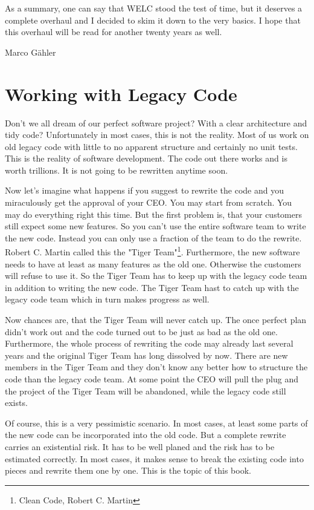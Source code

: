 As a summary, one can say that WELC stood the test of time, but it deserves a complete overhaul and I decided to skim it down to the very basics. I hope that this overhaul will be read for another twenty years as well.

Marco Gähler

\chapter{Working with Legacy Code}

Don't we all dream of our perfect software project? With a clear architecture and tidy code? Unfortunately in most cases, this is not the reality. Most of us work on old legacy code with little to no apparent structure and certainly no unit tests. This is the reality of software development. The code out there works and is worth trillions. It is not going to be rewritten anytime soon.

Now let's imagine what happens if you suggest to rewrite the code and you miraculously get the approval of your CEO. You may start from scratch. You may do everything right this time. But the first problem is, that your customers still expect some new features. So you can't use the entire software team to write the new code. Instead you can only use a fraction of the team to do the rewrite. Robert C. Martin called this the "Tiger Team"\footnote{Clean Code, Robert C. Martin}. Furthermore, the new software needs to have at least as many features as the old one. Otherwise the customers will refuse to use it. So the Tiger Team has to keep up with the legacy code team in addition to writing the new code. The Tiger Team hast to catch up with the legacy code team which in turn makes progress as well.

Now chances are, that the Tiger Team will never catch up. The once perfect plan didn't work out and the code turned out to be just as bad as the old one. Furthermore, the whole process of rewriting the code may already last several years and the original Tiger Team has long dissolved by now. There are new members in the Tiger Team and they don't know any better how to structure the code than the legacy code team. At some point the CEO will pull the plug and the project of the Tiger Team will be abandoned, while the legacy code still exists.

Of course, this is a very pessimistic scenario. In most cases, at least some parts of the new code can be incorporated into the old code. But a complete rewrite carries an existential risk. It has to be well planed and the risk has to be estimated correctly. In most cases, it makes sense to break the existing code into pieces and rewrite them one by one. This is the topic of this book.

